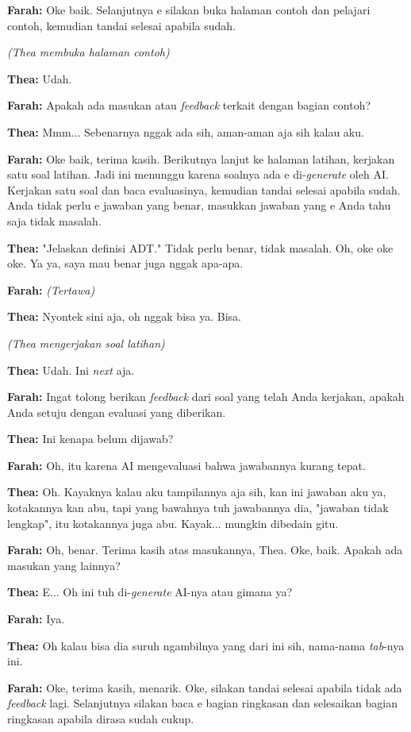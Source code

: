 \textbf{Farah:} Oke baik. Selanjutnya e silakan buka halaman contoh dan pelajari contoh, kemudian tandai selesai apabila sudah.

\textit{(Thea membuka halaman contoh)}

\textbf{Thea:} Udah.

\textbf{Farah:} Apakah ada masukan atau \textit{feedback} terkait dengan bagian contoh?

\textbf{Thea:} Mmm... Sebenarnya nggak ada sih, aman-aman aja sih kalau aku.

\textbf{Farah:} Oke baik, terima kasih. Berikutnya lanjut ke halaman latihan, kerjakan satu soal latihan. Jadi ini menunggu karena soalnya ada e di-\textit{generate} oleh AI. Kerjakan satu soal dan baca evaluasinya, kemudian tandai selesai apabila sudah. Anda tidak perlu e jawaban yang benar, masukkan jawaban yang e Anda tahu saja tidak masalah.

\textbf{Thea:} "Jelaskan definisi ADT." Tidak perlu benar, tidak masalah. Oh, oke oke oke. Ya ya, saya mau benar juga nggak apa-apa.

\textbf{Farah:} \textit{(Tertawa)}

\textbf{Thea:} Nyontek sini aja, oh nggak bisa ya. Bisa.

\textit{(Thea mengerjakan soal latihan)}

\textbf{Thea:} Udah. Ini \textit{next} aja.

\textbf{Farah:} Ingat tolong berikan \textit{feedback} dari soal yang telah Anda kerjakan, apakah Anda setuju dengan evaluasi yang diberikan.

\textbf{Thea:} Ini kenapa belum dijawab?

\textbf{Farah:} Oh, itu karena AI mengevaluasi bahwa jawabannya kurang tepat.

\textbf{Thea:} Oh. Kayaknya kalau aku tampilannya aja sih, kan ini jawaban aku ya, kotakannya kan abu, tapi yang bawahnya tuh jawabannya dia, "jawaban tidak lengkap", itu kotakannya juga abu. Kayak... mungkin dibedain gitu.

\textbf{Farah:} Oh, benar. Terima kasih atas masukannya, Thea. Oke, baik. Apakah ada masukan yang lainnya?

\textbf{Thea:} E... Oh ini tuh di-\textit{generate} AI-nya atau gimana ya?

\textbf{Farah:} Iya.

\textbf{Thea:} Oh kalau bisa dia suruh ngambilnya yang dari ini sih, nama-nama \textit{tab}-nya ini.

\textbf{Farah:} Oke, terima kasih, menarik. Oke, silakan tandai selesai apabila tidak ada \textit{feedback} lagi. Selanjutnya silakan baca e bagian ringkasan dan selesaikan bagian ringkasan apabila dirasa sudah cukup.

